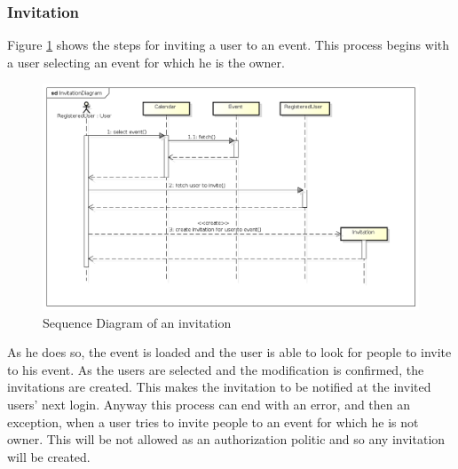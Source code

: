 \subsubsection{Invitation}
Figure \ref{fig:invitseqdiag} shows the steps for inviting a user to an event. This process begins with a user selecting an event for which he is the owner.
\begin{center}
 \begin{figure}[H]
    \includegraphics[width=1\textwidth,height=1\textwidth]{./UMLDiagram/sequence/InvitationDiagram/InvitationDiagram.png}
    \caption{Sequence Diagram of an invitation}
     \label{fig:invitseqdiag}
     \end{figure}
   \end{center}
As he does so, the event is loaded and the user is able to look for people to invite to his event. As the users are selected and the modification is confirmed, the invitations are created. This makes the invitation to be notified at the invited users' next login. Anyway this process can end with an error, and then an exception, when a user tries to invite people to an event for which he is not owner. This will be not allowed as an authorization politic and so any invitation will be created.
\newpage
